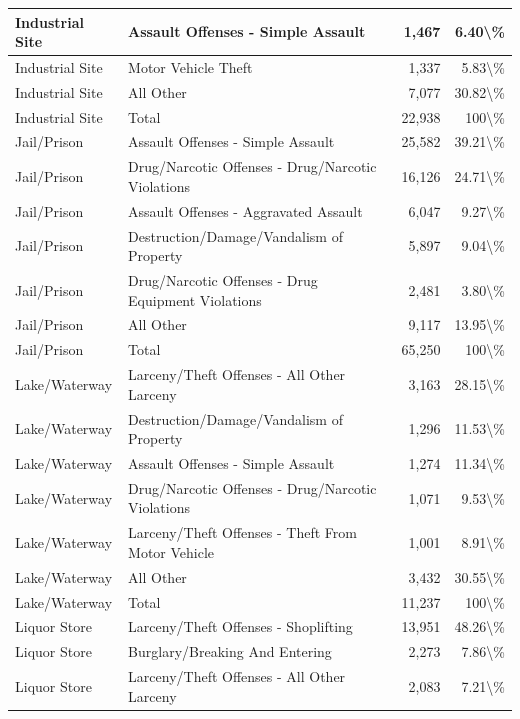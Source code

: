 \documentclass[
]{krantz}
\begin{document}
\begin{longtable}[t]{l|l|r|r}
\hline
Industrial Site & Assault Offenses - Simple Assault & 1,467 & 6.40\textbackslash{}\%\\
\hline
Industrial Site & Motor Vehicle Theft & 1,337 & 5.83\textbackslash{}\%\\
\hline
Industrial Site & All Other & 7,077 & 30.82\textbackslash{}\%\\
\hline
Industrial Site & Total & 22,938 & 100\textbackslash{}\%\\
\hline
Jail/Prison & Assault Offenses - Simple Assault & 25,582 & 39.21\textbackslash{}\%\\
\hline
Jail/Prison & Drug/Narcotic Offenses - Drug/Narcotic Violations & 16,126 & 24.71\textbackslash{}\%\\
\hline
Jail/Prison & Assault Offenses - Aggravated Assault & 6,047 & 9.27\textbackslash{}\%\\
\hline
Jail/Prison & Destruction/Damage/Vandalism of Property & 5,897 & 9.04\textbackslash{}\%\\
\hline
Jail/Prison & Drug/Narcotic Offenses - Drug Equipment Violations & 2,481 & 3.80\textbackslash{}\%\\
\hline
Jail/Prison & All Other & 9,117 & 13.95\textbackslash{}\%\\
\hline
Jail/Prison & Total & 65,250 & 100\textbackslash{}\%\\
\hline
Lake/Waterway & Larceny/Theft Offenses - All Other Larceny & 3,163 & 28.15\textbackslash{}\%\\
\hline
Lake/Waterway & Destruction/Damage/Vandalism of Property & 1,296 & 11.53\textbackslash{}\%\\
\hline
Lake/Waterway & Assault Offenses - Simple Assault & 1,274 & 11.34\textbackslash{}\%\\
\hline
Lake/Waterway & Drug/Narcotic Offenses - Drug/Narcotic Violations & 1,071 & 9.53\textbackslash{}\%\\
\hline
Lake/Waterway & Larceny/Theft Offenses - Theft From Motor Vehicle & 1,001 & 8.91\textbackslash{}\%\\
\hline
Lake/Waterway & All Other & 3,432 & 30.55\textbackslash{}\%\\
\hline
Lake/Waterway & Total & 11,237 & 100\textbackslash{}\%\\
\hline
Liquor Store & Larceny/Theft Offenses - Shoplifting & 13,951 & 48.26\textbackslash{}\%\\
\hline
Liquor Store & Burglary/Breaking And Entering & 2,273 & 7.86\textbackslash{}\%\\
\hline
Liquor Store & Larceny/Theft Offenses - All Other Larceny & 2,083 & 7.21\textbackslash{}\%\\

\end{longtable}
\end{document}
